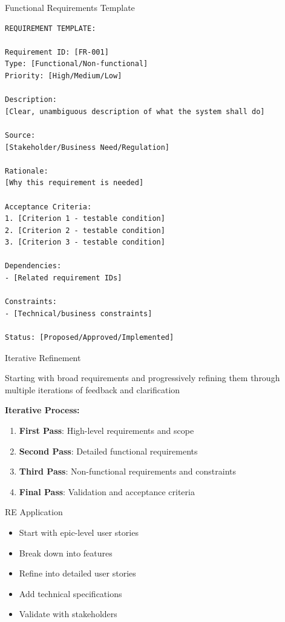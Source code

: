 \documentclass{beamer}
\begin{document}
\begin{frame}[fragile]{Functional Requirements Template}
    \begin{lstlisting}[style=code, caption={Structured Requirements Template}]
REQUIREMENT TEMPLATE:

Requirement ID: [FR-001]
Type: [Functional/Non-functional]
Priority: [High/Medium/Low]

Description: 
[Clear, unambiguous description of what the system shall do]

Source:
[Stakeholder/Business Need/Regulation]

Rationale:
[Why this requirement is needed]

Acceptance Criteria:
1. [Criterion 1 - testable condition]
2. [Criterion 2 - testable condition]
3. [Criterion 3 - testable condition]

Dependencies:
- [Related requirement IDs]

Constraints:
- [Technical/business constraints]

Status: [Proposed/Approved/Implemented]
    \end{lstlisting}
\end{frame}

\begin{frame}[t]{Iterative Refinement}
    \begin{block}{}
        Starting with broad requirements and progressively refining them through multiple iterations of feedback and clarification
    \end{block}
    
    \textbf{Iterative Process:}
    \begin{enumerate}
        \scriptsize
        \item \textbf{First Pass}: High-level requirements and scope
        \item \textbf{Second Pass}: Detailed functional requirements
        \item \textbf{Third Pass}: Non-functional requirements and constraints
        \item \textbf{Final Pass}: Validation and acceptance criteria
    \end{enumerate}
    
    \begin{exampleblock}{RE Application}
        \begin{itemize}
            \scriptsize
            \item Start with epic-level user stories
            \item Break down into features
            \item Refine into detailed user stories
            \item Add technical specifications
            \item Validate with stakeholders
        \end{itemize}
    \end{exampleblock}
\end{frame}
\end{document}
